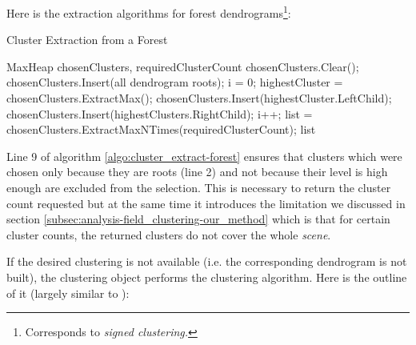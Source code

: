 Here is the extraction algorithms for forest dendrograms\footnote{Corresponds to {\it signed clustering.}}:

\begin{algorithm}[H]
\caption{Cluster Extraction from a Forest}
\label{algo:cluster_extract-forest}
\begin{algorithmic}[1]

\Require MaxHeap chosenClusters, requiredClusterCount
\Statex
\State chosenClusters.Clear();
\State chosenClusters.Insert(all dendrogram roots);
\State i = 0;
	\State highestCluster = chosenClusters.ExtractMax();
    \State chosenClusters.Insert(highestCluster.LeftChild);
    \State chosenClusters.Insert(highestClusters.RightChild);
    \State i++;
\EndWhile
\State list = chosenClusters.ExtractMaxNTimes(requiredClusterCount);
\Statex
\Return list
\end{algorithmic}
\end{algorithm}

Line 9 of algorithm \ref{algo:cluster_extract-forest} ensures that clusters which were chosen only because they are roots (line 2) and not because their level is high enough are excluded from the selection. This is necessary to return the cluster count requested but at the same time it introduces the limitation we discussed in section \ref{subsec:analysis-field_clustering-our_method} which is that for certain cluster counts, the returned clusters do not cover the whole {\it scene}.

If the desired clustering is not available (i.e. the corresponding dendrogram is not built), the clustering object performs the clustering algorithm. Here is the outline of it (largely similar to \citet{Telea99}):

